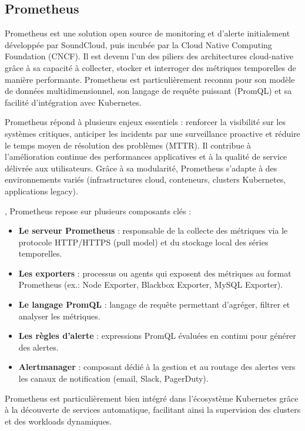 \subsection{Prometheus}

Prometheus est une solution open source de monitoring et d’alerte initialement développée par SoundCloud, puis incubée par la Cloud Native Computing Foundation (CNCF). Il est devenu l’un des piliers des architectures cloud-native grâce à sa capacité à collecter, stocker et interroger des métriques temporelles de manière performante. Prometheus est particulièrement reconnu pour son modèle de données multidimensionnel, son langage de requête puissant (PromQL) et sa facilité d’intégration avec Kubernetes.

Prometheus répond à plusieurs enjeux essentiels  : renforcer la visibilité sur les systèmes critiques, anticiper les incidents par une surveillance proactive et réduire le temps moyen de résolution des problèmes (MTTR). Il contribue à l’amélioration continue des performances applicatives et à la qualité de service délivrée aux utilisateurs. Grâce à sa modularité, Prometheus s’adapte à des environnements variés (infrastructures cloud, conteneurs, clusters Kubernetes, applications legacy).

, Prometheus repose sur plusieurs composants clés  :
\begin{itemize}
	\item \textbf{Le serveur Prometheus}  : responsable de la collecte des métriques via le protocole HTTP/HTTPS (pull model) et du stockage local des séries temporelles.
	\item \textbf{Les exporters}  : processus ou agents qui exposent des métriques au format Prometheus (ex.: Node Exporter, Blackbox Exporter, MySQL Exporter).
	\item \textbf{Le langage PromQL}  : langage de requête permettant d’agréger, filtrer et analyser les métriques.
	\item \textbf{Les règles d’alerte}  : expressions PromQL évaluées en continu pour générer des alertes.
	\item \textbf{Alertmanager}  : composant dédié à la gestion et au routage des alertes vers les canaux de notification (email, Slack, PagerDuty).
\end{itemize}

Prometheus est particulièrement bien intégré dans l’écosystème Kubernetes grâce à la découverte de services automatique, facilitant ainsi la supervision des clusters et des workloads dynamiques.


